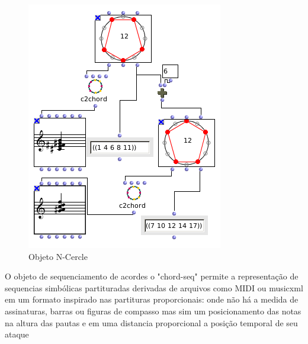 \documentclass[
	12pt,				%
	openright,			%
	twoside,			%
	a4paper,			%
	english,			%
	french,				%
	spanish,			%
	brazil				%
	]{abntex2}
\begin{document}
\begin{figure}[!h]
	\caption{\label{fig_grafico}Objeto N-Cercle }
	\begin{center}
	    \includegraphics[scale=0.6]{estudosM21/ncercle.png}
	\end{center}
\end{figure}


O objeto de sequenciamento de acordes o "chord-seq" permite a representação de sequencias simbólicas partituradas derivadas de arquivos como MIDI ou musicxml em um formato inspirado nas partituras proporcionais: onde não há a medida de assinaturas, barras ou figuras de compasso mas sim um posicionamento das notas na altura das pautas e em uma distancia proporcional a posição temporal de seu ataque
\end{document}
